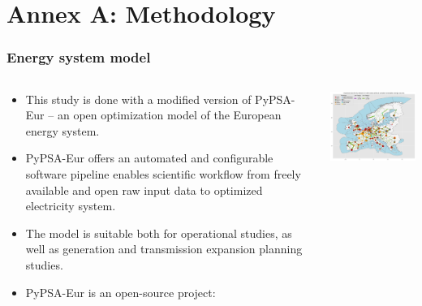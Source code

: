 
\section{Annex A: Methodology}


\begin{frame}
  \label{methodology} %
  \frametitle{Energy system model}

  \begin{columns}[T]
  \begin{column}{7cm}
  {\footnotesize
  \begin{itemize}
  \item This study is done with a modified version of \alert{PyPSA-Eur} -- an open optimization model of the European energy system.
  \item PyPSA-Eur offers an automated and configurable software pipeline enables scientific workflow from freely available and open raw input data to optimized electricity system. 
  \item The model is suitable both for operational studies, as well as generation and transmission expansion planning studies. 
  \item  PyPSA-Eur is an open-source project: \\
  \faGithub~ \\
  \faBook~ \\
  \faLink~ 
  \end{itemize}
  }
  \end{column}

  \begin{column}{9cm}
    \centering
    \vspace{0.1cm}
    \includegraphics[width=8cm]{images/elec_s_100.png}
  \end{column}
  \end{columns}

\end{frame}



